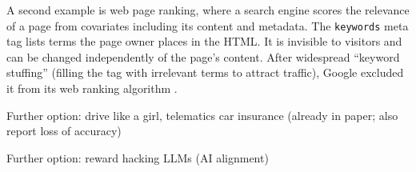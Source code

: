 \documentclass{article}
\newcommand{\jonas}[1]{\textcolor{myorange}{JP: #1}}
\newcommand{\linus}[1]{{\color{mygreen}LK: #1}}
\newcommand{\E}{\mathbb{E}}
\newcommand{\given}{\,|\,}
\begin{document}
A second example is web page ranking, where a search engine scores the
relevance of a page from covariates including its content and metadata. The
\texttt{keywords} meta tag lists terms the page owner places in the HTML. It
is invisible to visitors and can be changed independently of the page's content. After widespread ``keyword stuffing''
(filling the tag with irrelevant terms to attract traffic), Google excluded
it from its web ranking algorithm \citep{cutts2009keywords}.


Further option: drive like a girl, telematics car insurance (already in paper; also report loss of accuracy)

Further option: reward hacking LLMs (AI alignment)


\newpage






    
\end{document}
